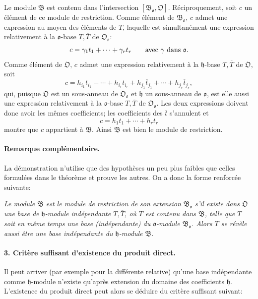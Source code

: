 Le module \(\mathfrak B\) est contenu dans l'intersection \([\mathfrak B_{\mathfrak o},\mathfrak O]\). Réciproquement, soit \(c\) un élément de ce module de restriction. Comme élément de \(\mathfrak B_{\mathfrak o}\), \(c\) admet une expression au moyen des éléments de \(T\), laquelle est simultanément une expression relativement à la \(\mathfrak o\)-base \(T,\overline T\) de \(\mathfrak O_{\mathfrak o}\):
\[
c=\gamma_1t_1+\cdots+\gamma_rt_r
\qquad\hbox{avec }\gamma\hbox{ dans }\mathfrak o.
\]
Comme élément de \(\mathfrak O\), \(c\) admet une expression relativement à la \(\mathfrak h\)-base \(T,\overline T\) de \(\mathfrak O\), soit
\[
c=h_{i_1}t_{i_1}+\cdots+h_{i_r}t_{i_r}
+h_{j_1}\overline t_{j_1}+\cdots+h_{j_s}\overline t_{j_s},
\]
qui, puisque \(\mathfrak O\) est un sous-anneau de \(\mathfrak O_{\mathfrak o}\) et \(\mathfrak h\) un sous-anneau de \(\mathfrak o\), est elle aussi une expression relativement à la \(\mathfrak o\)-base \(T,\overline T\) de \(\mathfrak O_{\mathfrak o}\). Les deux expressions doivent donc avoir les mêmes coefficients; les coefficients des \(\overline t\) s'annulent et
\[
c=h_1t_1+\cdots+h_rt_r
\]
montre que \(c\) appartient à \(\mathfrak B\). Ainsi \(\mathfrak B\) est bien le module de restriction.

\paragraph{Remarque complémentaire.}
La démonstration n'utilise que des hypothèses un peu plus faibles que celles formulées dans le théorème et prouve les autres. On a donc la forme renforcée suivante:

\emph{Le module \(\mathfrak B\) est le module de restriction de son extension \(\mathfrak B_{\mathfrak o}\) s'il existe dans \(\mathfrak O\) une base de \(\mathfrak h\)-module indépendante \(T,\overline T\), où \(T\) est contenu dans \(\mathfrak B\), telle que \(T\) soit en même temps une base (indépendante) du \(\mathfrak o\)-module \(\mathfrak B_{\mathfrak o}\). Alors \(T\) se révèle aussi être une base indépendante du \(\mathfrak h\)-module \(\mathfrak B\).}

\paragraph{3. Critère suffisant d'existence du produit direct.}
Il peut arriver (par exemple pour la différente relative) qu'une base indépendante comme \(\mathfrak h\)-module n'existe qu'après extension du domaine des coefficients \(\mathfrak h\). L'existence du produit direct peut alors se déduire du critère suffisant suivant:


